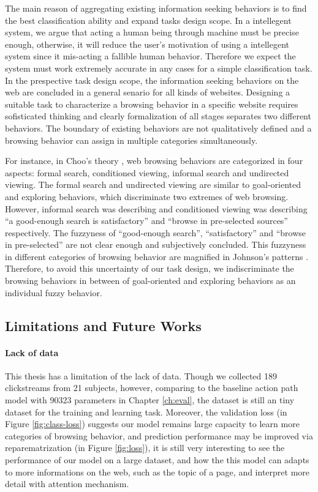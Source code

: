 The main reason of aggregating existing information seeking behaviors is to find the best 
classification ability and expand tasks design scope.
In a intellegent system, we argue that acting a human being through machine must be precise enough,
otherwise, it will reduce the user's motivation of using a intellegent system since
it mis-acting a fallible human behavior. Therefore we expect the system must work
extremely accurate in any cases for a simple classification task.
In the prespective task design scope, the information seeking behaviors on the web 
are concluded in a general senario for all kinds of websites. Designing a suitable task 
 to characterize a browsing behavior in a specific website requires sofisticated thinking 
and clearly formalization of all stages separates two different behaviors.
The boundary of existing behaviors are not qualitatively defined and a browsing behavior
can assign in multiple categories simultaneously.

For instance, in Choo's theory \cite{choo1999information}, web browsing behaviors 
are categorized in four aspects:
formal search, conditioned viewing, informal search and undirected viewing.
The formal search and undirected viewing are similar to goal-oriented and exploring behaviors,
which discriminate two extremes of web browsing.
However, informal search was describing and conditioned viewing was describing
``a good-enough search is satisfactory'' and ``browse in pre-selected sources'' respectively.
The fuzzyness of ``good-enough search'', ``satisfactory'' and ``browse in pre-selected''
are not clear enough and subjectively concluded. This fuzzyness in different categories of browsing
behavior are magnified in Johnson's patterns \cite{johnson2017patterns}.
Therefore, to avoid this uncertainty of our task design, we indiscriminate the browsing behaviors
in between of goal-oriented and exploring behaviors as an individual fuzzy behavior.

\subsection{Limitations and Future Works}

\paragraph{Lack of data} 
This thesis has a limitation of the lack of data. 
Though we collected 189 clickstreams from 21 subjects, however, 
comparing to the baseline action path model with 90323 parameters in Chapter \ref{ch:eval},
the dataset is still an tiny dataset for the training and learning task.
Moreover, the validation loss (in Figure \ref{fig:class-loss}) suggests our model remains large capacity to learn more
categories of browsing behavior, and prediction performance may be improved
via reparematrization (in Figure \ref{fig:loss}), 
it is still very interesting to see the performance of our model on a large dataset,
and how the this model can adapts to more informations on the web, such as the topic of 
a page, and interpret more detail with attention mechanism.

